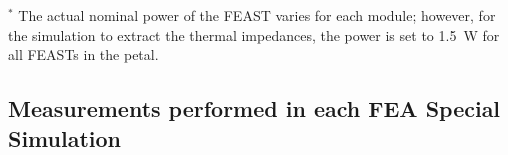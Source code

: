 \let\arraystretcha\arraystretch
\renewcommand\arraystretch{1.4} %
\begin{table}[h!]
\begin{center}
\end{center}
\caption{ Description of the 3 thermal simulations required to obtain the thermal impedances.
}
\label{tab:simulation_runs}
\end{table}
\let\arraystretch\arraystretcha

$^*$ The actual nominal power of the FEAST varies for each module; however, for the simulation to extract
the thermal impedances, the power is set to 1.5~W for all FEASTs in the petal.\\






\subsection{Measurements performed in each FEA Special Simulation}


